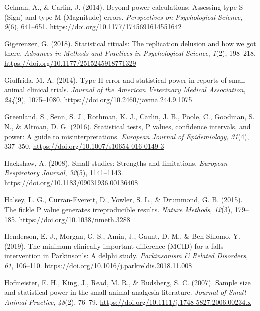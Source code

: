 \documentclass[authordate, meta]{jote-new-article}
\begin{document}
	Gelman, A., \& Carlin, J. (2014). Beyond power calculations: Assessing type S (Sign) and type M (Magnitude) errors. \emph{Perspectives on Psychological Science}, \emph{9}(6), 641--651. \url{https://doi.org/10.1177/1745691614551642}



	Gigerenzer, G. (2018). Statistical rituals: The replication delusion and how we got there. \emph{Advances in Methods and Practices in Psychological Science}, \emph{1}(2), 198--218. \url{https://doi.org/10.1177/2515245918771329}



	Giuffrida, M. A. (2014). Type II error and statistical power in reports of small animal clinical trials. \emph{Journal of the American Veterinary Medical Association}, \emph{244}(9), 1075--1080. \url{https://doi.org/10.2460/javma.244.9.1075}



	Greenland, S., Senn, S. J., Rothman, K. J., Carlin, J. B., Poole, C., Goodman, S. N., \& Altman, D. G. (2016). Statistical tests, P values, confidence intervals, and power: A guide to misinterpretations. \emph{European Journal of Epidemiology,} \emph{31}(4), 337--350. \url{https://doi.org/10.1007/s10654-016-0149-3}



	Hackshaw, A. (2008). Small studies: Strengths and limitations. \emph{European Respiratory Journal}, \emph{32}(5), 1141--1143. \url{https://doi.org/10.1183/09031936.00136408}



	Halsey, L. G., Curran-Everett, D., Vowler, S. L., \& Drummond, G. B. (2015). The fickle P value generates irreproducible results. \emph{Nature Methods}, \emph{12}(3), 179--185. \url{https://doi.org/10.1038/nmeth.3288}



	Henderson, E. J., Morgan, G. S., Amin, J., Gaunt, D. M., \& Ben-Shlomo, Y. (2019). The minimum clinically important difference (MCID) for a falls intervention in Parkinson's: A delphi study. \emph{Parkinsonism \& Related Disorders}, \emph{61}, 106--110. \url{https://doi.org/10.1016/j.parkreldis.2018.11.008}



	Hofmeister, E. H., King, J., Read, M. R., \& Budsberg, S. C. (2007). Sample size and statistical power in the small-animal analgesia literature. \emph{Journal of Small Animal Practice}, \emph{48}(2), 76--79. \url{https://doi.org/10.1111/j.1748-5827.2006.00234.x}
\end{document}
